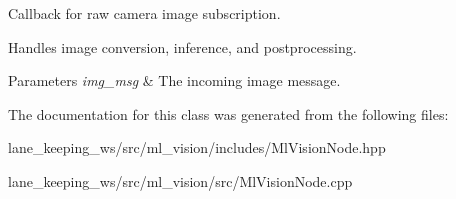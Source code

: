 Callback for raw camera image subscription. 

Handles image conversion, inference, and postprocessing.


\begin{DoxyParams}{Parameters}
{\em img\+\_\+msg} & The incoming image message. \\
\hline
\end{DoxyParams}


The documentation for this class was generated from the following files\+:\begin{DoxyCompactItemize}
\item 
lane\+\_\+keeping\+\_\+ws/src/ml\+\_\+vision/includes/Ml\+Vision\+Node.\+hpp\item 
lane\+\_\+keeping\+\_\+ws/src/ml\+\_\+vision/src/Ml\+Vision\+Node.\+cpp\end{DoxyCompactItemize}
